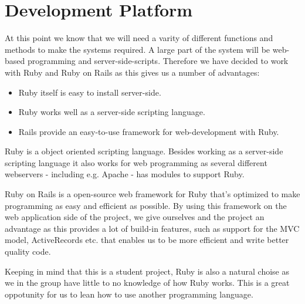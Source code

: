 \section{Development Platform}
At this point we know that we will need a varity of different functions and methods to make the systems required. 
A large part of the system will be web-based programming and server-side-scripts. 
Therefore we have decided to work with Ruby and Ruby on Rails as this gives us a number of advantages:

\begin{itemize}
	\item Ruby itself is easy to install server-side.
	\item Ruby works well as a server-side scripting language.
	\item Rails provide an easy-to-use framework for web-development with Ruby.
\end{itemize}

Ruby is a object oriented scripting language.
Besides working as a server-side scripting language it also works for web programming as several different webservers - including e.g. Apache - has modules to support Ruby. 

Ruby on Rails is a open-source web framework for Ruby that's optimized to make programming as easy and efficient as possible. 
By using this framework on the web application side of the project, we give ourselves and the project an advantage as this provides a lot of build-in features, such as support for the MVC model, ActiveRecords etc. that enables us to be more efficient and write better quality code.

Keeping in mind that this is a student project, Ruby is also a natural choise as we in the group have little to no knowledge of how Ruby works. 
This is a great oppotunity for us to lean how to use another programming language.
